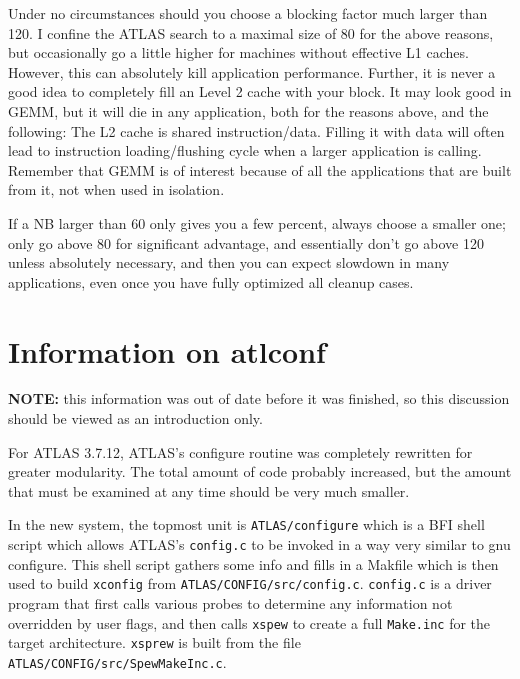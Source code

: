 \documentclass[11pt]{article}
\begin{document}
Under no circumstances should you choose a blocking factor much larger
than 120.  I confine the ATLAS search to a maximal size of 80 for the
above reasons, but occasionally go a little higher for machines without
effective L1 caches.  However, this can absolutely kill application
performance.  Further, it is never a good idea to completely fill
an Level 2 cache with your block.  It may look good in GEMM, but it
will die in any application, both for the reasons above, and the
following: The L2 cache is shared instruction/data.  Filling it
with data will often lead to instruction loading/flushing cycle
when a larger application is calling.  Remember that GEMM is of
interest because of all the applications that are built from it,
not when used in isolation.

If a NB larger than 60 only gives you a few percent, always choose a 
smaller one; only go above 80 for significant advantage, and essentially
don't go above 120 unless absolutely necessary, and then you can expect
slowdown in many applications, even once you have fully optimized all
cleanup cases.

\newpage
\section{Information on atlconf}
{\bf NOTE:} this information was out of date before it was finished, so
this discussion should be viewed as an introduction only.

For ATLAS 3.7.12, ATLAS's configure routine was completely rewritten for
greater modularity.  The total amount of code probably increased, but the
amount that must be examined at any time should be very much smaller. 

In the new system, the topmost unit is {\tt ATLAS/configure} which is a 
BFI shell script which allows ATLAS's {\tt config.c} to be invoked in a
way very similar to gnu configure.  This shell script gathers some info
and fills in a Makfile which is then used to build {\tt xconfig} from
{\tt ATLAS/CONFIG/src/config.c}.  {\tt config.c} is a driver program
that first calls various probes to determine any information not overridden by
user flags, and then calls {\tt xspew} to create a full {\tt Make.inc} for
the target architecture.  {\tt xsprew} is built from the file 
{\tt ATLAS/CONFIG/src/SpewMakeInc.c}.  
\end{document}
